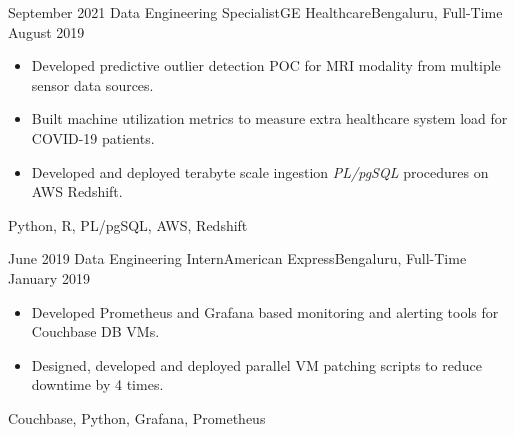 \begin{experiences}
  \experience
    {September 2021} {Data Engineering Specialist}{GE Healthcare}{Bengaluru, Full-Time}
    {August 2019}    {
                      \begin{itemize}
                        \item {Developed predictive outlier detection POC for MRI modality from multiple sensor data sources.}
                        \item {Built machine utilization metrics to measure extra healthcare system load for COVID-19 patients.}
                        \item {Developed and deployed terabyte scale ingestion \textit{PL/pgSQL} procedures on AWS Redshift.}
                      \end{itemize}
                    }
                    {Python, R, PL/pgSQL, AWS, Redshift}
  \emptySeparator
  

  
  \experience
    {June 2019} {Data Engineering Intern}{American Express}{Bengaluru, Full-Time}
    {January 2019}    {
                      \begin{itemize}
                        \item Developed Prometheus and Grafana based monitoring and alerting tools for Couchbase DB VMs.
                        \item Designed, developed and deployed parallel VM patching scripts to reduce downtime by 4 times.
                      \end{itemize}
                    }
                    {Couchbase, Python, Grafana, Prometheus}
  \emptySeparator
  

\end{experiences}
